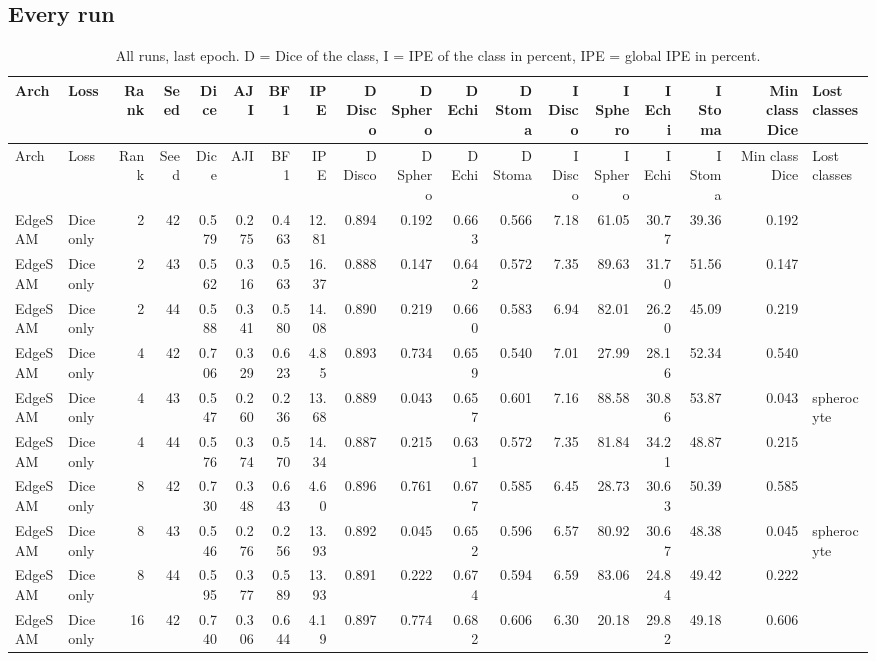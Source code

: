 \documentclass[10pt]{article}
\begin{document}
\begin{landscape}
\section{Every run}
{\tiny
\begin{longtable}{l l r r r r r r r r r r r r r r r l}
\caption{All runs, last epoch. D = Dice of the class, I = IPE of the class in percent, IPE = global IPE in percent.}\label{tab:runs}\\
\toprule
Arch & Loss & Rank & Seed & Dice & AJI & BF1 & IPE & D Disco & D Sphero & D Echi & D Stoma & I Disco & I Sphero & I Echi & I Stoma & Min class Dice & Lost classes \\
\midrule
\endfirsthead
\toprule
Arch & Loss & Rank & Seed & Dice & AJI & BF1 & IPE & D Disco & D Sphero & D Echi & D Stoma & I Disco & I Sphero & I Echi & I Stoma & Min class Dice & Lost classes \\
\midrule
\endhead
\bottomrule
\endfoot
EdgeSAM & Dice only & 2 & 42 & 0.579 & 0.275 & 0.463 & 12.81 & 0.894 & 0.192 & 0.663 & 0.566 & 7.18 & 61.05 & 30.77 & 39.36 & 0.192 &  \\
EdgeSAM & Dice only & 2 & 43 & 0.562 & 0.316 & 0.563 & 16.37 & 0.888 & 0.147 & 0.642 & 0.572 & 7.35 & 89.63 & 31.70 & 51.56 & 0.147 &  \\
EdgeSAM & Dice only & 2 & 44 & 0.588 & 0.341 & 0.580 & 14.08 & 0.890 & 0.219 & 0.660 & 0.583 & 6.94 & 82.01 & 26.20 & 45.09 & 0.219 &  \\
EdgeSAM & Dice only & 4 & 42 & 0.706 & 0.329 & 0.623 & 4.85 & 0.893 & 0.734 & 0.659 & 0.540 & 7.01 & 27.99 & 28.16 & 52.34 & 0.540 &  \\
EdgeSAM & Dice only & 4 & 43 & 0.547 & 0.260 & 0.236 & 13.68 & 0.889 & 0.043 & 0.657 & 0.601 & 7.16 & 88.58 & 30.86 & 53.87 & 0.043 & spherocyte \\
EdgeSAM & Dice only & 4 & 44 & 0.576 & 0.374 & 0.570 & 14.34 & 0.887 & 0.215 & 0.631 & 0.572 & 7.35 & 81.84 & 34.21 & 48.87 & 0.215 &  \\
EdgeSAM & Dice only & 8 & 42 & 0.730 & 0.348 & 0.643 & 4.60 & 0.896 & 0.761 & 0.677 & 0.585 & 6.45 & 28.73 & 30.63 & 50.39 & 0.585 &  \\
EdgeSAM & Dice only & 8 & 43 & 0.546 & 0.276 & 0.256 & 13.93 & 0.892 & 0.045 & 0.652 & 0.596 & 6.57 & 80.92 & 30.67 & 48.38 & 0.045 & spherocyte \\
EdgeSAM & Dice only & 8 & 44 & 0.595 & 0.377 & 0.589 & 13.93 & 0.891 & 0.222 & 0.674 & 0.594 & 6.59 & 83.06 & 24.84 & 49.42 & 0.222 &  \\
EdgeSAM & Dice only & 16 & 42 & 0.740 & 0.306 & 0.644 & 4.19 & 0.897 & 0.774 & 0.682 & 0.606 & 6.30 & 20.18 & 29.82 & 49.18 & 0.606 &  \\

\end{longtable}}
\end{landscape}
\end{document}
